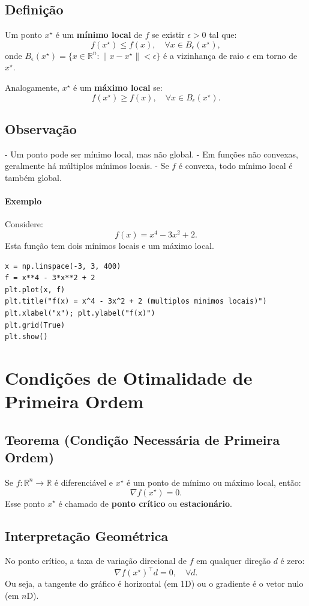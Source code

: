 \documentclass[9pt,a4paper]{extarticle}
\begin{document}
\subsection*{Definição}
Um ponto $x^\star$ é um \textbf{mínimo local} de $f$ se existir $\epsilon > 0$ tal que:
\[
f(x^\star) \le f(x), \quad \forall x \in B_\epsilon(x^\star),
\]
onde $B_\epsilon(x^\star) = \{ x \in \mathbb{R}^n : \|x - x^\star\| < \epsilon \}$ é a vizinhança de raio $\epsilon$ em torno de $x^\star$.

Analogamente, $x^\star$ é um \textbf{máximo local} se:
\[
f(x^\star) \ge f(x), \quad \forall x \in B_\epsilon(x^\star).
\]

\subsection*{Observação}
- Um ponto pode ser mínimo local, mas não global.  
- Em funções não convexas, geralmente há múltiplos mínimos locais.  
- Se $f$ é convexa, todo mínimo local é também global.

\paragraph{Exemplo}
Considere:
\[
f(x) = x^4 - 3x^2 + 2.
\]
Esta função tem dois mínimos locais e um máximo local.

\begin{lstlisting}
x = np.linspace(-3, 3, 400)
f = x**4 - 3*x**2 + 2
plt.plot(x, f)
plt.title("f(x) = x^4 - 3x^2 + 2 (multiplos minimos locais)")
plt.xlabel("x"); plt.ylabel("f(x)")
plt.grid(True)
plt.show()
\end{lstlisting}

\section{Condições de Otimalidade de Primeira Ordem}

\subsection*{Teorema (Condição Necessária de Primeira Ordem)}

Se $f:\mathbb{R}^n \to \mathbb{R}$ é diferenciável e $x^\star$ é um ponto de mínimo ou máximo local, então:
\[
\nabla f(x^\star) = 0.
\]
Esse ponto $x^\star$ é chamado de \textbf{ponto crítico} ou \textbf{estacionário}.

\subsection*{Interpretação Geométrica}
No ponto crítico, a taxa de variação direcional de $f$ em qualquer direção $d$ é zero:
\[
\nabla f(x^\star)^\top d = 0, \quad \forall d.
\]
Ou seja, a tangente do gráfico é horizontal (em 1D) ou o gradiente é o vetor nulo (em $n$D).
\end{document}
